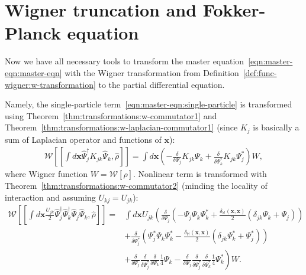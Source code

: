\documentclass[12pt,aip,jmp,amssymb,amsmath]{revtex4-1}
\begin{document}
\section{Wigner truncation and Fokker-Planck equation}

Now we have all necessary tools to transform the master equation~\ref{eqn:master-eqn:master-eqn} with the Wigner transformation from Definition~\ref{def:func-wigner:w-transformation} to the partial differential equation.

Namely, the single-particle term~\ref{eqn:master-eqn:single-particle} is transformed using Theorem~\ref{thm:transformations:w-commutator1} and Theorem~\ref{thm:transformations:w-laplacian-commutator1} (since $K_j$ is basically a sum of Laplacian operator and functions of $\boldsymbol{x}$):
\begin{equation}\begin{split}
    \mathcal{W} \left[ [ \int d\boldsymbol{x} \hat{\Psi}_j^\dagger K_{jk} \hat{\Psi}_k, \hat{\rho} ] \right]
    = \int d\boldsymbol{x} \left(
            - \frac{\delta}{\delta \Psi_j} K_{jk} \Psi_k
            + \frac{\delta}{\delta \Psi_k^*} K_{jk} \Psi_j^*
        \right)
        W,
\end{split}\end{equation}
where Wigner function $W = \mathcal{W}[\hat{\rho}]$.
Nonlinear term is transformed with Theorem~\ref{thm:transformations:w-commutator2} (minding the locality of interaction and assuming $U_{kj} = U_{jk}$):
\begin{equation}\begin{split}
    \mathcal{W} \left[
        [
            \int d\boldsymbol{x} \frac{U_{jk}}{2}
                \hat{\Psi}_j^\dagger \hat{\Psi}_k^\dagger \hat{\Psi}_j \hat{\Psi}_k,
            \hat{\rho}
        ]
    \right]
    = & \int d\boldsymbol{x} U_{jk} \left(
        \frac{\delta}{\delta \Psi_j} \left(
            - \Psi_j \Psi_k \Psi_k^*
            + \frac{\delta_{\mathbb{M}}(\boldsymbol{x}, \boldsymbol{x})}{2} ( \delta_{jk} \Psi_k + \Psi_j )
        \right) \right. \\
    &   \left. + \frac{\delta}{\delta \Psi_j^*} \left(
            \Psi_j^* \Psi_k \Psi_k^*
            - \frac{\delta_{\mathbb{M}}(\boldsymbol{x}, \boldsymbol{x})}{2} ( \delta_{jk} \Psi_k^* + \Psi_j^* )
        \right) \right. \\
    &   \left.
            + \frac{\delta}{\delta \Psi_j}
            \frac{\delta}{\delta \Psi_j^*}
            \frac{\delta}{\delta \Psi_k}
            \frac{1}{4} \Psi_k
            - \frac{\delta}{\delta \Psi_j}
            \frac{\delta}{\delta \Psi_j^*}
            \frac{\delta}{\delta \Psi_k^*}
            \frac{1}{4} \Psi_k^*
        \right) W.
\end{split}\end{equation}
\end{document}
